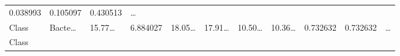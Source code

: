\documentclass[
]{article}
\begin{document}
\begin{longtable}[]{@{}lllllllllll@{}}
\begin{minipage}[t]{0.06\columnwidth}
0.038993\strut
\end{minipage} & \begin{minipage}[t]{0.06\columnwidth}\raggedright
0.105097\strut
\end{minipage} & \begin{minipage}[t]{0.06\columnwidth}\raggedright
0.430513\strut
\end{minipage} & \begin{minipage}[t]{0.03\columnwidth}\raggedright
\ldots{}\strut
\end{minipage}\tabularnewline
\begin{minipage}[t]{0.06\columnwidth}\raggedright
Class\strut
\end{minipage} & \begin{minipage}[t]{0.06\columnwidth}\raggedright
Bacte\ldots{}\strut
\end{minipage} & \begin{minipage}[t]{0.09\columnwidth}\raggedright
15.77\ldots{}\strut
\end{minipage} & \begin{minipage}[t]{0.06\columnwidth}\raggedright
6.884027\strut
\end{minipage} & \begin{minipage}[t]{0.09\columnwidth}\raggedright
18.05\ldots{}\strut
\end{minipage} & \begin{minipage}[t]{0.06\columnwidth}\raggedright
17.91\ldots{}\strut
\end{minipage} & \begin{minipage}[t]{0.09\columnwidth}\raggedright
10.50\ldots{}\strut
\end{minipage} & \begin{minipage}[t]{0.06\columnwidth}\raggedright
10.36\ldots{}\strut
\end{minipage} & \begin{minipage}[t]{0.06\columnwidth}\raggedright
0.732632\strut
\end{minipage} & \begin{minipage}[t]{0.06\columnwidth}\raggedright
0.732632\strut
\end{minipage} & \begin{minipage}[t]{0.03\columnwidth}\raggedright
\ldots{}\strut
\end{minipage}\tabularnewline
\begin{minipage}[t]{0.06\columnwidth}\raggedright
Class\strut
\end{minipage} & \begin{minipage}[t]{0.06\columnwidth}\raggedright

\end{minipage}
\end{longtable}
\end{document}
